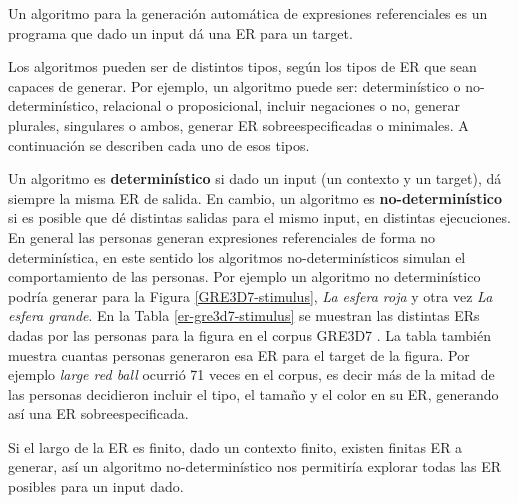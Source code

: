 Un algoritmo para la generaci\'on autom\'atica de expresiones referenciales es un programa que dado un input d\'a una ER para un target.

Los algoritmos pueden ser de distintos tipos, seg\'un los tipos de ER que sean capaces de generar. Por ejemplo, un algoritmo puede ser: determin\'{i}stico o no-determin\'{i}stico, relacional o proposicional, incluir negaciones o no, generar plurales, singulares o ambos,
generar ER sobreespecificadas o minimales. A continuaci\'on se describen cada uno de esos tipos.

Un algoritmo es {\bf determin\'{i}stico} si dado un input (un contexto y un target), d\'a siempre la misma ER de salida. En cambio, un algoritmo es {\bf no-determin\'{i}stico} si es posible que d\'e distintas salidas para el mismo input, en distintas ejecuciones. En general las personas generan expresiones referenciales de forma no determin\'istica, en este sentido los algoritmos no-determin\'isticos simulan el comportamiento de las personas. 
Por ejemplo un algoritmo no determin\'istico podr\'ia generar para la Figura \ref{GRE3D7-stimulus}, {\it La esfera roja} y otra vez {\it La esfera grande}. En la Tabla \ref{er-gre3d7-stimulus} se muestran las distintas ERs dadas por las personas para la figura en el corpus GRE3D7 \cite{gre3d7}. La tabla tambi\'en muestra cuantas personas generaron esa ER para el target de la figura. Por ejemplo {\it large red ball} ocurri\'o 71 veces en el corpus, es decir m\'as de la mitad de las personas decidieron incluir el tipo, el tama\~no y el color en su ER, generando as\'i una ER sobreespecificada.

Si el largo de la ER es finito, dado un contexto finito, existen finitas ER a generar, as\'i un algoritmo no-determin\'istico nos permitir\'ia explorar todas las ER posibles para un input dado.

